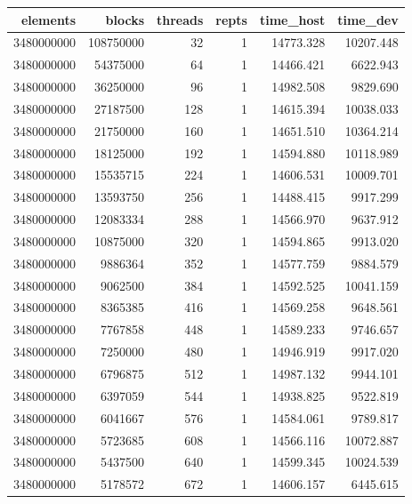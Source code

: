 \documentclass{article}
\begin{document}
			\begin{table}[H]
				\centering
				\begin{adjustbox}{width=\textwidth, keepaspectratio}
					\begin{tabular}{|r|r|r|r|r|r|}
						\hline
						elements & blocks & threads & repts & time\_host & time\_dev \\ \hline
						3480000000 & 108750000 & 32 & 1 & 14773.328 & 10207.448 \\ \hline
						3480000000 & 54375000 & 64 & 1 & 14466.421 & 6622.943 \\ \hline
						3480000000 & 36250000 & 96 & 1 & 14982.508 & 9829.690 \\ \hline
						3480000000 & 27187500 & 128 & 1 & 14615.394 & 10038.033 \\ \hline
						3480000000 & 21750000 & 160 & 1 & 14651.510 & 10364.214 \\ \hline
						3480000000 & 18125000 & 192 & 1 & 14594.880 & 10118.989 \\ \hline
						3480000000 & 15535715 & 224 & 1 & 14606.531 & 10009.701 \\ \hline
						3480000000 & 13593750 & 256 & 1 & 14488.415 & 9917.299 \\ \hline
						3480000000 & 12083334 & 288 & 1 & 14566.970 & 9637.912 \\ \hline
						3480000000 & 10875000 & 320 & 1 & 14594.865 & 9913.020 \\ \hline
						3480000000 & 9886364 & 352 & 1 & 14577.759 & 9884.579 \\ \hline
						3480000000 & 9062500 & 384 & 1 & 14592.525 & 10041.159 \\ \hline
						3480000000 & 8365385 & 416 & 1 & 14569.258 & 9648.561 \\ \hline
						3480000000 & 7767858 & 448 & 1 & 14589.233 & 9746.657 \\ \hline
						3480000000 & 7250000 & 480 & 1 & 14946.919 & 9917.020 \\ \hline
						3480000000 & 6796875 & 512 & 1 & 14987.132 & 9944.101 \\ \hline
						3480000000 & 6397059 & 544 & 1 & 14938.825 & 9522.819 \\ \hline
						3480000000 & 6041667 & 576 & 1 & 14584.061 & 9789.817 \\ \hline
						3480000000 & 5723685 & 608 & 1 & 14566.116 & 10072.887 \\ \hline
						3480000000 & 5437500 & 640 & 1 & 14599.345 & 10024.539 \\ \hline
						3480000000 & 5178572 & 672 & 1 & 14606.157 & 6445.615 \\ \hline

\end{tabular}
\end{adjustbox}
\end{table}
\end{document}
